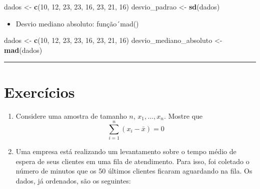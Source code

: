 \documentclass[
]{book}
\newenvironment{Shaded}{\begin{snugshade}}{\end{snugshade}}
\newcommand{\DecValTok}[1]{\textcolor[rgb]{0.00,0.00,0.81}{#1}}
\newcommand{\FunctionTok}[1]{\textcolor[rgb]{0.13,0.29,0.53}{\textbf{#1}}}
\newcommand{\NormalTok}[1]{#1}
\newcommand{\OtherTok}[1]{\textcolor[rgb]{0.56,0.35,0.01}{#1}}
\providecommand{\tightlist}{%
  \setlength{\itemsep}{0pt}\setlength{\parskip}{0pt}}
\begin{document}
\begin{Shaded}
\begin{Highlighting}[]
\NormalTok{dados }\OtherTok{\textless{}{-}} \FunctionTok{c}\NormalTok{(}\DecValTok{10}\NormalTok{, }\DecValTok{12}\NormalTok{, }\DecValTok{23}\NormalTok{, }\DecValTok{23}\NormalTok{, }\DecValTok{16}\NormalTok{, }\DecValTok{23}\NormalTok{, }\DecValTok{21}\NormalTok{, }\DecValTok{16}\NormalTok{)}
\NormalTok{desvio\_padrao }\OtherTok{\textless{}{-}} \FunctionTok{sd}\NormalTok{(dados)}
\end{Highlighting}
\end{Shaded}

\begin{itemize}
\tightlist
\item
  Desvio mediano absoluto: função´mad()
\end{itemize}

\begin{Shaded}
\begin{Highlighting}[]
\NormalTok{dados }\OtherTok{\textless{}{-}} \FunctionTok{c}\NormalTok{(}\DecValTok{10}\NormalTok{, }\DecValTok{12}\NormalTok{, }\DecValTok{23}\NormalTok{, }\DecValTok{23}\NormalTok{, }\DecValTok{16}\NormalTok{, }\DecValTok{23}\NormalTok{, }\DecValTok{21}\NormalTok{, }\DecValTok{16}\NormalTok{)}
\NormalTok{desvio\_mediano\_absoluto }\OtherTok{\textless{}{-}} \FunctionTok{mad}\NormalTok{(dados)}
\end{Highlighting}
\end{Shaded}

\begin{center}\rule{0.5\linewidth}{0.5pt}\end{center}

\section{Exercícios}\label{exercuxedcios-2}

\begin{enumerate}
\def\labelenumi{\arabic{enumi}.}
\item
  Considere uma amostra de tamanho \(n\), \(x_1,\ldots,x_n\). Mostre que\\
  \[
    \displaystyle \sum_{i=1}^{n} (x_i-\bar{x}) = 0
  \]
\item
  Uma empresa está realizando um levantamento sobre o tempo médio de espera de seus clientes em uma fila de atendimento. Para isso, foi coletado o número de minutos que os 50 últimos clientes ficaram aguardando na fila. Os dados, já ordenados, são os seguintes:
\end{enumerate}
\end{document}
